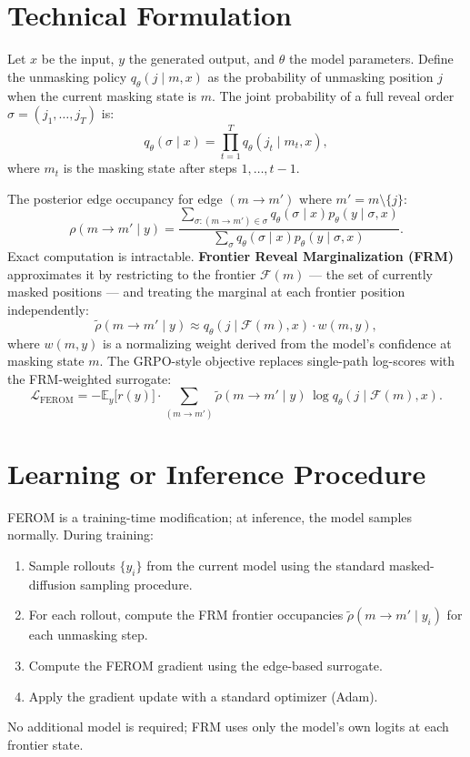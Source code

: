 \documentclass[10pt,twocolumn]{article}
\begin{document}
\section{Technical Formulation}

Let $x$ be the input, $y$ the generated output, and $\theta$ the model
parameters. Define the unmasking policy $q_\theta(j \mid m, x)$ as the
probability of unmasking position $j$ when the current masking state is $m$.
The joint probability of a full reveal order $\sigma = (j_1, \ldots, j_T)$ is:
\[
  q_\theta(\sigma \mid x) = \prod_{t=1}^T q_\theta(j_t \mid m_t, x),
\]
where $m_t$ is the masking state after steps $1,\ldots,t-1$.

The posterior edge occupancy for edge $(m \to m')$ where $m' = m \setminus \{j\}$:
\[
  \rho(m \to m' \mid y) = \frac{\sum_{\sigma: (m\to m')\in\sigma} q_\theta(\sigma\mid x) p_\theta(y \mid \sigma, x)}
    {\sum_{\sigma} q_\theta(\sigma \mid x) p_\theta(y \mid \sigma, x)}.
\]
Exact computation is intractable. \textbf{Frontier Reveal Marginalization (FRM)}
approximates it by restricting to the frontier $\mathcal{F}(m)$ --- the set of
currently masked positions --- and treating the marginal at each frontier
position independently:
\[
  \tilde{\rho}(m \to m' \mid y) \approx q_\theta(j \mid \mathcal{F}(m), x) \cdot w(m, y),
\]
where $w(m, y)$ is a normalizing weight derived from the model's confidence
at masking state $m$. The GRPO-style objective replaces single-path log-scores
with the FRM-weighted surrogate:
\[
  \mathcal{L}_\text{FEROM} = -\mathbb{E}_y\bigl[r(y)\bigr]
    \cdot \sum_{(m\to m')} \tilde{\rho}(m \to m' \mid y)\,
    \log q_\theta(j \mid \mathcal{F}(m), x).
\]

\section{Learning or Inference Procedure}

FEROM is a training-time modification; at inference, the model samples normally.
During training:
\begin{enumerate}[itemsep=2pt,parsep=0pt]
  \item Sample rollouts $\{y_i\}$ from the current model using the standard
    masked-diffusion sampling procedure.
  \item For each rollout, compute the FRM frontier occupancies
    $\tilde{\rho}(m \to m' \mid y_i)$ for each unmasking step.
  \item Compute the FEROM gradient using the edge-based surrogate.
  \item Apply the gradient update with a standard optimizer (Adam).
\end{enumerate}
No additional model is required; FRM uses only the model's own logits at each
frontier state.
\end{document}
